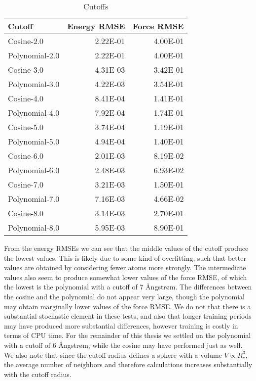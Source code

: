 \begin{table}[H]
\centering
\begin{tabular}{lrr}
\toprule
         Cutoff &  Energy RMSE &  Force RMSE \\
\midrule
     Cosine-2.0 &     2.22E-01 &    4.00E-01 \\
 Polynomial-2.0 &     2.22E-01 &    4.00E-01 \\
     Cosine-3.0 &     4.31E-03 &    3.42E-01 \\
 Polynomial-3.0 &     4.22E-03 &    3.54E-01 \\
     Cosine-4.0 &     8.41E-04 &    1.41E-01 \\
 Polynomial-4.0 &     7.92E-04 &    1.74E-01 \\
     Cosine-5.0 &     3.74E-04 &    1.19E-01 \\
 Polynomial-5.0 &     4.94E-04 &    1.40E-01 \\
     Cosine-6.0 &     2.01E-03 &    8.19E-02 \\
 Polynomial-6.0 &     2.48E-03 &    6.93E-02 \\
     Cosine-7.0 &     3.21E-03 &    1.50E-01 \\
 Polynomial-7.0 &     7.16E-03 &    4.66E-02 \\
     Cosine-8.0 &     3.14E-03 &    2.70E-01 \\
 Polynomial-8.0 &     5.95E-03 &    8.90E-01 \\
\bottomrule
\end{tabular}
\caption{Cutoffs}
\label{table:cutoffs}
\end{table}

From the energy RMSEs we can see that the middle values of the
cutoff produce the lowest values. This is likely due to some kind
of overfitting, such that better values are obtained by considering
fewer atoms more strongly. The intermediate values also
seem to produce somewhat lower values of the force RMSE,
of which the lowest is the polynomial with a cutoff of 7 Ångstrøm.
The differences between the cosine and the polynomial do not
appear very large, though the polynomial may obtain marginally
lower values of the force RMSE. We do not that there is a substantial
stochastic element in these tests, and also that longer training
periods may have produced more substantial differences, however
training is costly in terms of CPU time. For the remainder
of this thesis we settled on the polynomial with a cutoff of 6 Ångstrøm,
while the cosine may have performed just as well.
We also note that since the cutoff radius defines a sphere
with a volume $V \propto R_c^3$, the average number of neighbors and therefore
calculations increases substantially with the cutoff radius.

